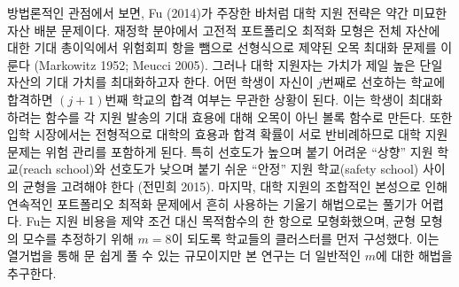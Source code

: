 \documentclass[11pt]{article} %
\newif\ifen
\theoremstyle{definition}
\theoremstyle{definition}
\begin{document}
\ifen
From a methodological standpoint, as Fu (2014) remarked, college application represents a somewhat subtle asset allocation problem. In computational finance, traditional portfolio optimization models weigh the sum of expected profit across all assets against a risk term, yielding a concave maximization problem with linear constraints (Markowitz 1952; Meucci 2005). But college applicants maximize the expected value of their \emph{best} asset: If a student is admitted to her $j$th choice, then she is indifferent as to whether she gets into her $(j+1)$th choice. As a result, the valuation function that students maximize is \emph{convex} in the expected utility associated with individual applications. Risk management is implicit in the college application problem because, in a typical admissions market, college preferability is negatively correlated with competitiveness. That is, students negotiate a tradeoff between attractive, selective “reach schools” and less preferable “safety schools” where admission is a safer bet (Jeon 2015). Finally, the combinatorial nature of the college application problem makes it difficult to solve using the gradient-based techniques used in continuous portfolio optimization. Fu estimated her equilibrium model (which considers application as a \emph{cost} rather than a constraint) by clustering the schools so that $m=8$, a scale at which enumeration is tractable. We pursue a more general solution.
\else
방법론적인 관점에서 보면, Fu (2014)가 주장한 바처럼 대학 지원 전략은 약간 미묘한 자산 배분 문제이다. 재정학 분야에서 고전적 포트폴리오 최적화 모형은 전체 자산에 대한 기대 총이익에서 위험회피 항을 뺌으로 선형식으로 제약된 오목 최대화 문제를 이룬다 (Markowitz 1952; Meucci 2005). 그러나 대학 지원자는 가치가 제일 높은 단일 자산의 기대 가치를 최대화하고자 한다. 어떤 학생이 자신이 $j$번째로 선호하는 학교에 합격하면 $(j+1)$번째 학교의 합격 여부는 무관한 상황이 된다. 이는 학생이 최대화하려는 함수를 각 지원 발송의 기대 효용에 대해 오목이 아닌 볼록 함수로 만든다. 또한 입학 시장에서는 전형적으로 대학의 효용과 합격 확률이 서로 반비례하므로 대학 지원 문제는 위험 관리를 포함하게 된다. 특히 선호도가 높으며 붙기 어려운 “상향” 지원 학교(reach school)와 선호도가 낮으며 붙기 쉬운 “안정” 지원 학교(safety school) 사이의 균형을 고려해야 한다 (전민희 2015). 마지막, 대학 지원의 조합적인 본성으로 인해 연속적인 포트폴리오 최적화 문제에서 흔히 사용하는 기울기 해법으로는 풀기가 어렵다. Fu는 지원 비용을 제약 조건 대신 목적함수의 한 항으로 모형화했으며, 균형 모형의 모수를 추정하기 위해 $m=8$이 되도록 학교들의 클러스터를 먼저 구성했다. 이는 열거법을 통해 문 쉽게 풀 수 있는 규모이지만 본 연구는 더 일반적인 $m$에 대한 해법을 추구한다.
\fi
\end{document}
